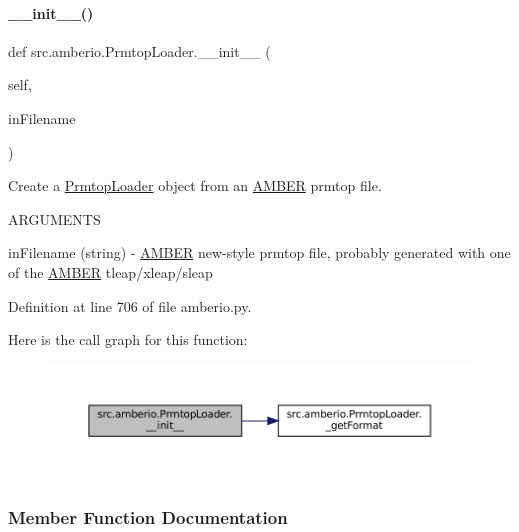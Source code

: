 \paragraph{\texorpdfstring{\+\_\+\+\_\+init\+\_\+\+\_\+()}{\_\_init\_\_()}}
{\footnotesize\ttfamily def src.\+amberio.\+Prmtop\+Loader.\+\_\+\+\_\+init\+\_\+\+\_\+ (\begin{DoxyParamCaption}\item[{}]{self,  }\item[{}]{in\+Filename }\end{DoxyParamCaption})}



Create a \hyperlink{classsrc_1_1amberio_1_1PrmtopLoader}{Prmtop\+Loader} object from an \hyperlink{classsrc_1_1amberio_1_1AMBER}{A\+M\+B\+ER} prmtop file. 

A\+R\+G\+U\+M\+E\+N\+TS

in\+Filename (string) -\/ \hyperlink{classsrc_1_1amberio_1_1AMBER}{A\+M\+B\+ER} \textquotesingle{}new-\/style\textquotesingle{} prmtop file, probably generated with one of the \hyperlink{classsrc_1_1amberio_1_1AMBER}{A\+M\+B\+ER} tleap/xleap/sleap 

Definition at line 706 of file amberio.\+py.

Here is the call graph for this function\+:
\nopagebreak
\begin{figure}[H]
\begin{center}
\leavevmode
\includegraphics[width=350pt]{classsrc_1_1amberio_1_1PrmtopLoader_a5090d17f6ee0ee8f323b1b3c5ee68181_cgraph}
\end{center}
\end{figure}


\subsubsection{Member Function Documentation}
\mbox{\label{classsrc_1_1amberio_1_1PrmtopLoader_a854cac838bde307ba4c069ba58b71cb6}} 
